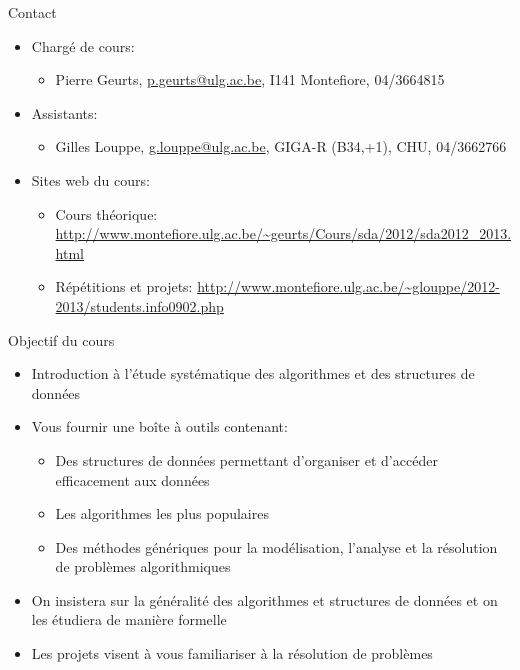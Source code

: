 
\begin{frame}{Contact}
\begin{itemize}
\item Chargé de cours:
\begin{itemize}
\item Pierre Geurts, \url{p.geurts@ulg.ac.be}, I141 Montefiore, 04/3664815
\end{itemize}
\item Assistants:
\begin{itemize}
\item Gilles Louppe, \url{g.louppe@ulg.ac.be}, GIGA-R (B34,+1), CHU, 04/3662766
\end{itemize}
\item Sites web du cours:
\begin{itemize}
\item Cours théorique:
{\small \url{http://www.montefiore.ulg.ac.be/~geurts/Cours/sda/2012/sda2012_2013.html}}
\item Répétitions et projets:
{\small \url{http://www.montefiore.ulg.ac.be/~glouppe/2012-2013/students.info0902.php}}
\end{itemize}
\end{itemize}
\end{frame}

\begin{frame}{Objectif du cours}

\begin{itemize}
\item Introduction à l'étude systématique des algorithmes et des
  structures de données
\item Vous fournir une boîte à outils contenant:
\begin{itemize}
\item Des structures de données permettant d'organiser et d'accéder efficacement
  aux données
\item Les algorithmes les plus populaires
\item Des méthodes génériques pour la modélisation, l'analyse et la résolution de problèmes algorithmiques
\end{itemize}
\item On insistera sur la généralité des algorithmes et structures de données et on les étudiera de manière formelle
\item Les projets visent à vous familiariser à la résolution de problèmes
\end{itemize}

\end{frame}

